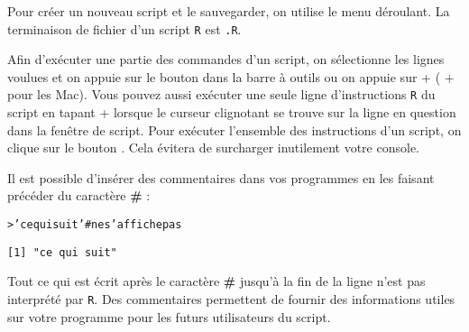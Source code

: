 \documentclass[11pt]{article}
\makeatletter
\numberwithin{equation}{section}
\theoremstyle{remark}
\newenvironment{kframe}{%
 \def\at@end@of@kframe{}%
 \ifinner\ifhmode%
  \def\at@end@of@kframe{\end{minipage}}%
  \begin{minipage}{\columnwidth}%
 \fi\fi%
 \def\FrameCommand##1{\hskip\@totalleftmargin \hskip-\fboxsep
 \colorbox{shadecolor}{##1}\hskip-\fboxsep
     \hskip-\linewidth \hskip-\@totalleftmargin \hskip\columnwidth}%
 \MakeFramed {\advance\hsize-\width
   \@totalleftmargin\z@ \linewidth\hsize
   \@setminipage}}%
 {\par\unskip\endMakeFramed%
 \at@end@of@kframe}
\newenvironment{knitrout}{}{}
\newcommand{\hlstr}[1]{\textcolor[rgb]{0.43,0.21,0.1}{#1}}%
\newcommand{\hlcom}[1]{\textcolor[rgb]{0.54,0.25,0.27}{#1}}%
\newcommand{\hlstd}[1]{\textcolor[rgb]{0,0.2,0.4}{#1}}%
\makeatother
\begin{document}
Pour créer  un nouveau script et le sauvegarder, on utilise le menu déroulant.  La terminaison de fichier d'un  script \texttt{R} est \texttt{.R}.

 
Afin d'exécuter une partie des commandes d'un script, on sélectionne les lignes voulues et  
on appuie sur le bouton  dans la barre à outils ou 
on appuie sur  +  ( +  pour les Mac).  
Vous pouvez
aussi exécuter une seule ligne d'instructions \texttt R du script en tapant  + 
lorsque le curseur clignotant se trouve sur la ligne en question dans la
fenêtre de script.
Pour exécuter l'ensemble des instructions d'un script, on clique sur le bouton . Cela évitera
de surcharger inutilement votre console.

 
Il est possible d'ins\'erer des commentaires dans vos programmes en les faisant pr\'ec\'eder du caract\`ere \textbf{\#} : 
\begin{knitrout}
\color{fgcolor}\begin{kframe}
\begin{alltt}
\hlstd{> }\hlstr{'ce qui suit'} \hlcom{# ne s'affiche pas}
\end{alltt}
\begin{verbatim}
[1] "ce qui suit"
\end{verbatim}
\end{kframe}
\end{knitrout}

Tout ce qui est écrit après le caractère \textbf{\#} jusqu'à la fin de la ligne n'est pas interprété par \texttt R.
Des commentaires permettent de fournir des informations utiles sur votre programme pour les futurs utilisateurs du script.

\end{document}
